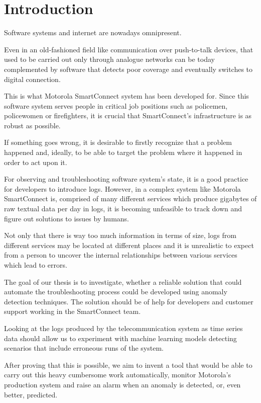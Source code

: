 \chapter{Introduction}
\label{introduction}

Software systems and internet are nowadays omnipresent.

Even in an old-fashioned field like communication over push-to-talk devices, that used to be carried out only through analogue networks can be today complemented by software that detects poor coverage and eventually switches to digital connection. 

This is what Motorola SmartConnect system has been developed for. Since this software system serves people in critical job positions such as policemen, policewomen or firefighters, it is crucial that SmartConnect's infrastructure is as robust as possible.

If something goes wrong, it is desirable to firstly recognize that a problem happened and, ideally, to be able to target the problem where it happened in order to act upon it.

For observing and troubleshooting software system's state, it is a good practice for developers to introduce logs.
However, in a complex system like Motorola SmartConnect is, comprised of many different services which produce gigabytes of raw textual data per day in logs, it is becoming unfeasible to track down and figure out solutions to issues by humans.

Not only that there is way too much information in terms of size, logs from different services may be located at different places and it is unrealistic to expect from a person to uncover the internal relationships between various services which lead to errors.

The goal of our thesis is to investigate, whether a reliable solution that could automate the troubleshooting process could be developed using anomaly detection techniques. The solution should be of help for developers and customer support working in the SmartConnect team.

Looking at the logs produced by the telecommunication system as time series data should allow us to experiment with machine learning models detecting scenarios that include erroneous runs of the system.

After proving that this is possible, we aim to invent a tool that would be able to carry out this heavy cumbersome work automatically, monitor Motorola's production system and raise an alarm when an anomaly is detected, or, even better, predicted.


